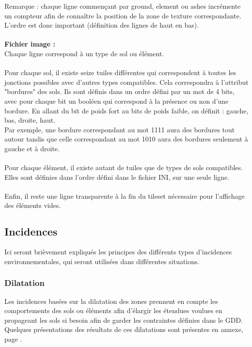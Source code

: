 \documentclass[a4paper]{memoir}
\begin{document}
				Remarque : chaque ligne commençant par ground, element ou ashes incrémente un compteur afin de connaître la position de la zone de texture correspondante. L'ordre est donc important (définition des lignes de haut en bas).\\
				\\
				\textbf{Fichier image :}\\
				Chaque ligne correspond à un type de sol ou élément.\\
				\\
				Pour chaque sol, il existe seize tuiles différentes qui correspondent à toutes les jonctions possibles avec d'autres types compatibles. Cela correspondra à l'attribut "bordures" des sols. Ils sont définis dans un ordre défini par un mot de 4 bits, avec pour chaque bit un booléen qui correspond à la présence ou non d'une bordure. En allant du bit de poids fort au bits de poids faible, on définit : gauche, bas, droite, haut.\\
				Par exemple, une bordure correspondant au mot 1111 aura des bordures tout autour tandis que celle correspondant au mot 1010 aura des bordures seulement à gauche et à droite.\\
				\\
				Pour chaque élément, il existe autant de tuiles que de types de sols compatibles. Elles sont définies dans l'ordre défini dans le fichier INI, sur une seule ligne.\\
				\\
				Enfin, il reste une ligne transparente à la fin du tileset nécessaire pour l'affichage des éléments vides.

			\subsection{Incidences}
				\label{IncidenceT}
				Ici seront brièvement expliqués les principes des différents types d'incidences environnementales, qui seront utilisées dans différentes situations.
				
				\subsubsection{Dilatation}
					Les incidences basées sur la dilatation des zones prennent en compte les comportements des sols ou éléments afin d'élargir les étendues voulues en propageant les sols si besoin afin de garder les contraintes définies dans le GDD.\\
					Quelques présentations des résultats de ces dilatations sont présentes en annexe, page \pageref{fig:dilatation}.
				
\end{document}
